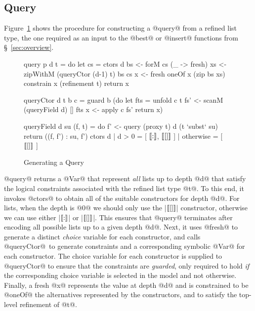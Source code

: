 \subsection{Query}\label{sec:query}

Figure~\ref{fig:query} shows the procedure for constructing a 
@query@ from a refined list type, \eg the one required as an input 
to the @best@ or @insert@ functions from \S~\ref{sec:overview}.

\begin{figure}[t!]
\begin{mdframed}
\begin{CenteredBox}
\begin{mcode}
query p d t = do
  let cs = ctors d
  bs <- forM cs (\_ -> fresh)
  xs <- zipWithM (queryCtor (d-1) t) bs cs
  x  <- fresh 
  oneOf x     (zip bs xs)
  constrain x (refinement t)
  return x

queryCtor d t b c = guard b (do
  let fts = unfold c t
  fs'    <- scanM (queryField d) [] fts
  x      <- apply c fs'
  return x)

queryField d su (f, t) = do
  f' <- query (proxy t) d (t `subst` su)
  return ((f, f') : su, f')                    
ctors d
  | d > 0     = [ $[\![:]\!]$, $[\![[]]\!]$ ]
  | otherwise = [ $[\![[]]\!]$ ]
\end{mcode}
\end{CenteredBox}
\end{mdframed}
\caption{Generating a Query}\label{fig:query}
\end{figure}





@query@ returns a @Var@ that represent \emph{all} lists up to 
depth @d@ that satisfy the logical constraints associated with 
the refined list type @t@.
%
To this end, it invokes @ctors@ to obtain all of the suitable
constructors for depth @d@. For lists, when
the depth is @0@ we should only use the |$[\![[]]\!]$| constructor,
otherwise we can use either |$[\![:]\!]$| or |$[\![[]]\!]$|. 
This ensures that @query@ terminates after encoding all possible
lists up to a given depth \hbox{@d@.}
%
Next, it uses @fresh@ to generate a distinct \emph{choice} 
variable for each constructor, and calls \hbox{@queryCtor@ to}
generate constraints and a corresponding symbolic @Var@ 
for each constructor. 
%
The choice variable for each constructor is supplied to 
@queryCtor@ to ensure that the constraints are \emph{guarded}, 
\ie only required to hold \emph{if} the corresponding choice 
variable is selected in the model and not otherwise.
%
Finally, a fresh @x@ represents the value at depth @d@ and 
is constrained to be @oneOf@ the alternatives represented 
by the constructors, and to satisfy the top-level refinement of @t@.
%


